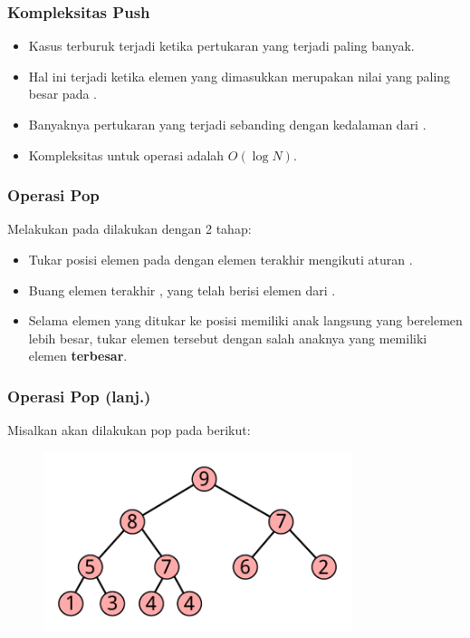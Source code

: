 \begin{frame}
\frametitle{Kompleksitas Push}
\begin{itemize}
  \item Kasus terburuk terjadi ketika pertukaran yang terjadi paling banyak.
  \item Hal ini terjadi ketika elemen yang dimasukkan merupakan nilai yang paling besar pada \pheap.
  \item Banyaknya pertukaran yang terjadi sebanding dengan kedalaman dari .
  \item Kompleksitas untuk operasi  adalah $O(\log{N})$.
\end{itemize}
\end{frame}

\begin{frame}
\frametitle{Operasi Pop}
Melakukan  pada \pbinaryHeap dilakukan dengan 2 tahap:
\begin{itemize}
  \item Tukar posisi elemen pada  dengan elemen terakhir mengikuti aturan .
  \item Buang elemen terakhir \pbinaryHeap, yang telah berisi elemen dari .
  \item Selama elemen yang ditukar ke posisi  memiliki anak langsung yang berelemen lebih besar, tukar elemen tersebut dengan salah anaknya yang memiliki elemen \textbf{terbesar}. 
\end{itemize}
\end{frame}

\begin{frame}
\frametitle{Operasi Pop (lanj.)}
Misalkan akan dilakukan pop pada \pheap berikut:
\begin{figure}
  \includegraphics[width=9cm]{asset/pop-1.pdf}
\end{figure}
\end{frame}

